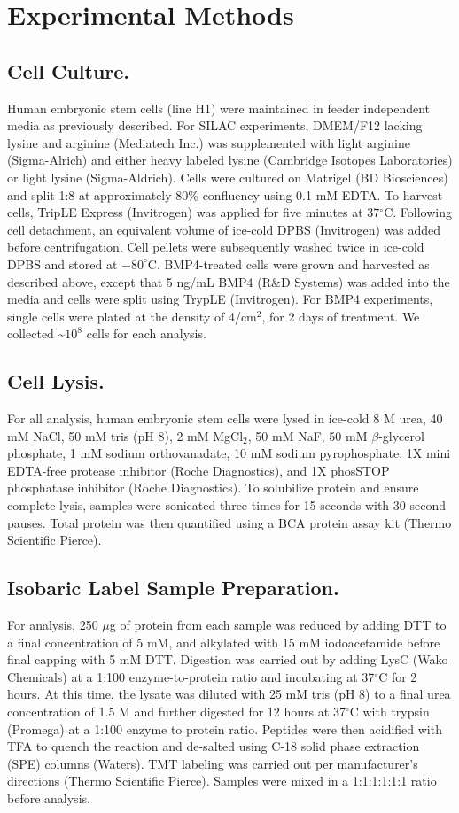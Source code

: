\section{Experimental Methods}

\subsection{Cell Culture.}
Human embryonic stem cells (line H1) were maintained in feeder independent media as previously described.\cite{feeder} For SILAC experiments, DMEM/F12 lacking lysine and arginine (Mediatech Inc.) was supplemented with light arginine (Sigma-Alrich) and either heavy labeled lysine (Cambridge Isotopes Laboratories) or light lysine (Sigma-Aldrich). Cells were cultured on Matrigel (BD Biosciences) and split 1:8 at approximately 80\% confluency using 0.1 mM EDTA. To harvest cells, TripLE Express (Invitrogen) was applied for five minutes at 37$^\circ$C. Following cell detachment, an equivalent volume of ice-cold DPBS (Invitrogen) was added before centrifugation. Cell pellets were subsequently washed twice in ice-cold DPBS and stored at $-80^\circ$C. BMP4-treated cells were grown and harvested as described above, except that 5 ng/mL BMP4 (R\&D Systems) was added into the media and cells were split using TrypLE (Invitrogen). For BMP4 experiments, single cells were plated at the density of 4/cm$^2$, for 2 days of treatment. We collected \textasciitilde$10^8$ cells for each analysis.

\subsection{Cell Lysis.}
For all analysis, human embryonic stem cells were lysed in ice-cold 8 M urea, 40 mM NaCl, 50 mM tris (pH 8), 2 mM MgCl$_2$, 50 mM NaF, 50 mM $\beta$-glycerol phosphate, 1 mM sodium orthovanadate, 10 mM sodium pyrophosphate, 1X mini EDTA-free protease inhibitor (Roche Diagnostics), and 1X phosSTOP phosphatase inhibitor (Roche Diagnostics). To solubilize protein and ensure complete lysis, samples were sonicated three times for 15 seconds with 30 second pauses. Total protein was then quantified using a BCA protein assay kit (Thermo Scientific Pierce).

\subsection{Isobaric Label Sample Preparation.}
For analysis, 250 $\mu$g of protein from each sample was reduced by adding DTT to a final concentration of 5 mM, and alkylated with 15 mM iodoacetamide before final capping with 5 mM DTT. Digestion was carried out by adding LysC (Wako Chemicals) at a 1:100 enzyme-to-protein ratio and incubating at 37$^\circ$C for 2 hours. At this time, the lysate was diluted with 25 mM tris (pH 8) to a final urea concentration of 1.5 M and further digested for 12 hours at 37$^\circ$C with trypsin (Promega) at a 1:100 enzyme to protein ratio. Peptides were then acidified with TFA to quench the reaction and de-salted using C-18 solid phase extraction (SPE) columns (Waters). TMT labeling was carried out per manufacturer's directions (Thermo Scientific Pierce). Samples were mixed in a 1:1:1:1:1:1 ratio before analysis.

